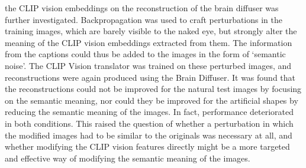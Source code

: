 the CLIP vision embeddings on the reconstruction of the brain diffuser was further investigated. Backpropagation was used to craft perturbations in the training images, which are barely visible to the naked eye, but strongly alter the meaning of the CLIP vision embeddings extracted from them. The information from the captions could thus be added to the images in the form of `semantic noise'. The CLIP Vision translator was trained on these perturbed images, and reconstructions were again produced using the Brain Diffuser. It was found that the reconstructions could not be improved for the natural test images by focusing on the semantic meaning, nor could they be improved for the artificial shapes by reducing the semantic meaning of the images. In fact, performance deteriorated in both conditions. This raised the question of whether a perturbation in which the modified images had to be similar to the originals was necessary at all, and whether modifying the CLIP vision features directly might be a more targeted and effective way of modifying the semantic meaning of the images.





